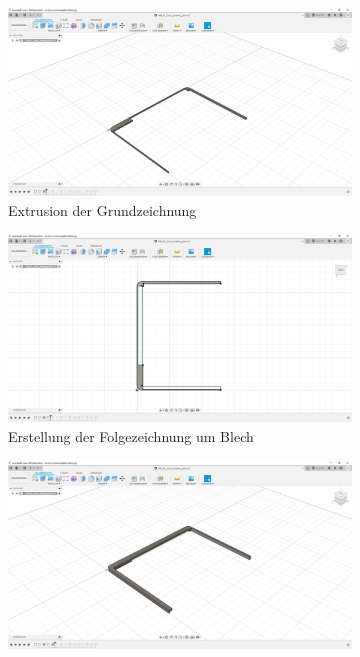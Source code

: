 \begin{figure}[H]
	\begin{subfigure}[t]{.3\linewidth}
		\includegraphics[width=\linewidth]{img/konstruktion_gehaeuse_links_001.png}
		\caption[Extrusion der Grundzeichnung]{Extrusion der Grundzeichnung}
		\label{fig:design-left-01}
	\end{subfigure}
	\begin{subfigure}[t]{.3\linewidth}
		\includegraphics[width=\linewidth]{img/konstruktion_gehaeuse_links_002.png}
		\caption[Erstellung der Folgezeichnung um Blech]{Erstellung der Folgezeichnung um Blech}
		\label{fig:design-left-02}
	\end{subfigure}
	\begin{subfigure}[t]{.3\linewidth}
		\includegraphics[width=\linewidth]{img/konstruktion_gehaeuse_links_003.png}

\end{subfigure}
\end{figure}

